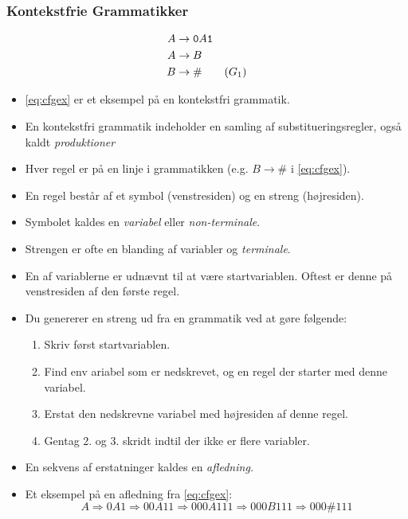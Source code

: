 \begin{frame}[allowframebreaks]
  \frametitle{Kontekstfrie Grammatikker}
  \begin{align}
	A & \rightarrow \text{\texttt{0}}A \text{\texttt{1}} \\
	A & \rightarrow B                                    \\
	B & \rightarrow \#
		\tag{$G_1$}
		\label{eq:cfgex}
  \end{align}
  \begin{itemize}
		\item \eqref{eq:cfgex} er et eksempel på en kontekstfri grammatik.
		\item En kontekstfri grammatik indeholder en samling af substitueringsregler, også kaldt \textit{produktioner}
		\item Hver regel er på en linje i grammatikken (e.g. $B \rightarrow \#$ i \eqref{eq:cfgex}).
		\item En regel består af et symbol (venstresiden) og en streng (højresiden).
		\item Symbolet kaldes en \textit{variabel} eller \textit{non-terminale}.
		\item Strengen er ofte en blanding af variabler og \textit{terminale}.
		\item En af variablerne er udnævnt til at være startvariablen. Oftest er denne på venstresiden af den første regel.
		\item Du genererer en streng ud fra en grammatik ved at gøre følgende:
		      \begin{enumerate}
			      \item Skriv først startvariablen.
			      \item Find env ariabel som er nedskrevet, og en regel der starter med denne variabel.
			      \item Erstat den nedskrevne variabel med højresiden af denne regel.
			      \item Gentag 2. og 3.   skridt indtil der ikke er flere variabler.
		      \end{enumerate}
		\item En sekvens af erstatninger kaldes en \textit{afledning.}
		\item Et eksempel på en afledning fra \eqref{eq:cfgex}:
		      \begin{equation*}
			      A \Rightarrow 0A1 \Rightarrow 00A11 \Rightarrow 000A111 \Rightarrow 000B111 \Rightarrow 000\#111
		      \end{equation*}


\end{itemize}
\end{frame}
